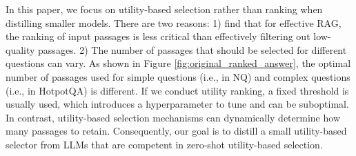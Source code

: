 In this paper, we focus on utility-based selection rather than ranking when distilling smaller models. There are two reasons: 1) \citet{ke2024bridging} find that for effective RAG, the ranking of input passages is less critical than effectively filtering out low-quality passages. 2) 
The number of passages that should be selected for different questions can vary. As shown in Figure \ref{fig:original_ranked_answer}, the optimal number of passages used for simple questions (i.e., in NQ) and complex questions (i.e., in HotpotQA) is different. 
If we conduct utility ranking, 
a fixed threshold is usually used, which introduces a hyperparameter to tune and can be suboptimal. 
In contrast, utility-based selection mechanisms can dynamically determine how many passages to retain. 
Consequently, our goal is to distill a small utility-based selector from LLMs that are competent in zero-shot utility-based selection. 

